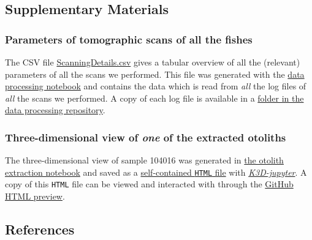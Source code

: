\hypertarget{supplementary-materials}{%
\subsection{Supplementary Materials}\label{supplementary-materials}}

\hypertarget{parameters-of-tomographic-scans-of-all-the-fishes}{%
\subsubsection{Parameters of tomographic scans of all the fishes}\label{parameters-of-tomographic-scans-of-all-the-fishes}}

The CSV file \href{https://github.com/habi/EAWAG-manuscript/blob/main/content/data/ScanningDetails.csv}{ScanningDetails.csv} gives a tabular overview of all the (relevant) parameters of all the scans we performed.
This file was generated with the \href{https://github.com/habi/EAWAG/blob/master/DataWrangling.ipynb}{data processing notebook} and contains the data which is read from \emph{all} the log files of \emph{all} the scans we performed.
A copy of each log file is available in a \href{https://github.com/habi/EAWAG/tree/master/logfiles}{folder in the data processing repository}.

\hypertarget{three-dimensional-view-of-one-of-the-extracted-otoliths}{%
\subsubsection{\texorpdfstring{Three-dimensional view of \emph{one} of the extracted otoliths}{Three-dimensional view of one of the extracted otoliths}}\label{three-dimensional-view-of-one-of-the-extracted-otoliths}}

The three-dimensional view of sample 104016 was generated in \href{https://github.com/habi/EAWAG/blob/master/ExtractOtoliths.ipynb}{the otolith extraction notebook} and saved as a \href{https://github.com/habi/EAWAG-manuscript/blob/main/content/data/104016.head.rec.otolith.region.3D.html}{self-contained \texttt{HTML} file} with \href{https://github.com/K3D-tools/K3D-jupyter}{\emph{K3D-jupyter}}.
A copy of this \texttt{HTML} file can be viewed and interacted with through the \href{https://htmlpreview.github.io/?https://github.com/habi/EAWAG-manuscript/blob/main/content/data/104016.head.rec.otolith.region.3D.html}{GitHub HTML preview}.

\hypertarget{references}{%
\subsection{References}\label{references}}

